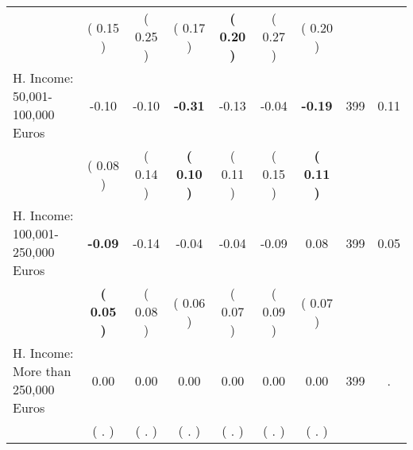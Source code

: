\begin{tabular}{lcccccccc}
 & (     0.15 ) & (     0.25 ) & (     0.17 ) & \textbf{(     0.20 )} & (     0.27 ) & (     0.20 ) & \\
H. Income: 50,001-100,000 Euros &     -0.10 &     -0.10 & \textbf{    -0.31} &     -0.13 &     -0.04 & \textbf{    -0.19} & 399 &       0.11 \\ 
 & (     0.08 ) & (     0.14 ) & \textbf{(     0.10 )} & (     0.11 ) & (     0.15 ) & \textbf{(     0.11 )} & \\
H. Income: 100,001-250,000 Euros & \textbf{    -0.09} &     -0.14 &     -0.04 &     -0.04 &     -0.09 &      0.08 & 399 &       0.05 \\ 
 & \textbf{(     0.05 )} & (     0.08 ) & (     0.06 ) & (     0.07 ) & (     0.09 ) & (     0.07 ) & \\
H. Income: More than 250,000 Euros &      0.00 &      0.00 &      0.00 &      0.00 &      0.00 &      0.00 & 399 &          . \\ 
 & (        . ) & (        . ) & (        . ) & (        . ) & (        . ) & (        . ) & \\
\bottomrule
\end{tabular}
